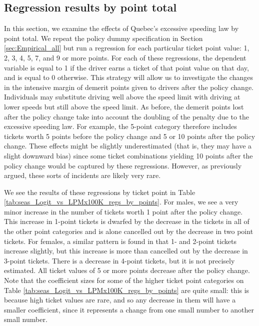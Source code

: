 \subsection{Regression results by point total}
\label{sec:Empirical_by_pts}

In this section, we examine the effects of Quebec’s excessive speeding law by point total. 
We repeat the policy dummy specification in 
Section \ref{sec:Empirical_all} 
but run a regression for each particular ticket point value: 1, 2, 3, 4, 5, 7, and 9 or more points. 
For each of these regressions, the dependent variable is equal to 1 
if the driver earns a ticket of that point value on that day, and is equal to 0 otherwise. 
This strategy will allow us to investigate the changes in the intensive margin of 
demerit points given to drivers after the policy change. 
Individuals may substitute driving well above the speed limit with driving at lower speeds 
but still above the speed limit. 
As before, the demerit points lost after the policy change take into account 
the doubling of the penalty due to the excessive speeding law. 
For example, the 5-point category therefore includes tickets 
worth 5 points before the policy change and 5 or 10 points after the policy change. 
These effects might be slightly underestimated (that is, they may have a slight downward bias) 
since some ticket combinations yielding 10 points after the policy change 
would be captured by these regressions. 
However, as previously argued, these sorts of incidents are likely very rare. %







We see the results of these regressions by ticket point in 
Table \ref{tab:seas_Logit_vs_LPMx100K_regs_by_points}. 
For males, we see a very minor increase in the number of tickets 
worth 1 point after the policy change. 
This increase in 1-point tickets is dwarfed by the decrease in the tickets 
in all of the other point categories and is alone cancelled out 
by the decrease in two point tickets. 
For females, a similar pattern is found in that 1- and 2-point tickets increase slightly,
but this increase is more than cancelled out by the decrease in 3-point tickets. 
There is a decrease in 4-point tickets, but it is not precisely estimated. 
All ticket values of 5 or more points decrease after the policy change. 
Note that the coefficient sizes for some of the higher ticket point categories on 
Table \ref{tab:seas_Logit_vs_LPMx100K_regs_by_points}
are quite small: 
this is because high ticket values are rare, 
and so any decrease in them will have a smaller coefficient, 
since it represents a change from one small number to another small number.

